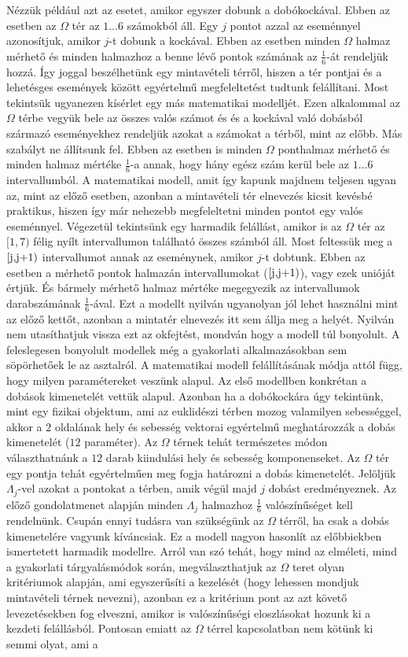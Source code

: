 \documentclass{article}
\begin{document}
Nézzük például azt az esetet, amikor egyszer dobunk a dobókockával. Ebben az esetben az $\Omega$ tér az $1 \ldots 6$ számokból áll. Egy $j$ pontot azzal az eseménnyel azonosítjuk, amikor $j$-t dobunk a kockával. Ebben az esetben minden $\Omega$ halmaz mérhető és minden halmazhoz a benne lévő pontok számának az $\frac{1}{6}$-át rendeljük hozzá. Így joggal beszélhetünk egy mintavételi térről, hiszen a tér pontjai és a lehetésges események között egyértelmű megfeleltetést tudtunk felállítani. Most tekintsük ugyanezen kísérlet egy más matematikai modelljét. Ezen alkalommal az $\Omega$ térbe vegyük bele az összes valós számot és és a kockával való dobásból származó eseményekhez rendeljük azokat a számokat a térből, mint az előbb. Más szabályt ne állítsunk fel. Ebben az esetben is minden $\Omega$ ponthalmaz mérhető és minden halmaz mértéke $\frac{1}{6}$-a annak, hogy hány egész szám kerül bele az $1 \ldots 6$ intervallumból. A matematikai modell, amit így kapunk majdnem teljesen ugyan az, mint az előző esetben, azonban a mintavételi tér elnevezés kicsit kevésbé praktikus, hiszen így már nehezebb megfeleltetni minden pontot egy valós eseménnyel. Végezetül tekintsünk egy harmadik felállást, amikor is az $\Omega$ tér az \([1,7)\) félig nyílt intervallumon található összes számból áll. Most feltessük meg a \([$j$,$j+1$)\) intervallumot annak az eseménynek, amikor $j$-t dobtunk. Ebben az esetben a mérhető pontok halmazán intervallumokat (\([$j$,$j+1$)\)), vagy ezek unióját értjük. És bármely mérhető halmaz mértéke megegyezik az intervallumok darabszámának $\frac{1}{6}$-ával. Ezt a modellt nyilván ugyanolyan jól lehet használni mint az előző kettőt, azonban a mintatér elnevezés itt sem állja meg a helyét. Nyilván nem utasíthatjuk vissza ezt az okfejtést, mondván hogy a modell túl bonyolult. A feleslegesen bonyolult modellek még a gyakorlati alkalmazásokban sem söpörhetőek le az asztalról. A matematikai modell felállításának módja attól függ, hogy milyen paramétereket veszünk alapul. Az első modellben konkrétan a dobások kimenetelét vettük alapul. Azonban ha a dobókockára úgy tekintünk, mint egy fizikai objektum, ami az euklidészi térben mozog valamilyen sebességgel, akkor a $2$ oldalának hely és sebesség vektorai egyértelmű meghatározzák a dobás kimenetelét ($12$ paraméter). Az $\Omega$ térnek tehát természetes módon választhatnánk a $12$ darab kiindulási hely és sebesség komponenseket. Az $\Omega$ tér egy pontja tehát egyértelműen meg fogja határozni a dobás kimenetelét. Jelöljük $\Lambda_j$-vel azokat a pontokat a térben, amik végül majd $j$ dobást eredményeznek. Az előző gondolatmenet alapján minden $\Lambda_j$ halmazhoz $\frac{1}{6}$ valószínűséget kell rendelnünk. Csupán ennyi tudásra van szükségünk az $\Omega$ térről, ha csak a dobás kimenetelére vagyunk kíváncsiak. Ez a modell nagyon hasonlít az előbbiekben ismertetett harmadik modellre. Arról van szó tehát, hogy mind az elméleti, mind a gyakorlati tárgyalásmódok során, megválaszthatjuk az $\Omega$ teret olyan kritériumok alapján, ami egyszerűsíti a kezelését (hogy lehessen mondjuk mintavételi térnek nevezni), azonban ez a kritérium pont az azt követő levezetésekben fog elveszni, amikor is valószínűségi eloszlásokat hozunk ki a kezdeti felállásból. Pontosan emiatt az $\Omega$ térrel kapcsolatban nem kötünk ki semmi olyat, ami a 
\end{document}
